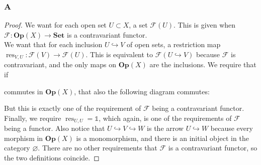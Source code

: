 \documentclass{article}
\newcommand{\fF}{\mathscr{F}}
\newcommand{\altid}{\mathds{1}}
\newcommand{\Set}{\mathbf{Set}} %
\newcommand{\Op}{\mathbf{Op}} %
\DeclareMathOperator{\res}{\mathrm{res}}
\let\emptyset\varnothing
\begin{document}
\subsubsection{A}\label{2.2.A}
\begin{proof}
    We want for each open set $U\subset X$, a set $\fF(U)$. This is given when $\fF:\Op(X)\to \Set$ is a contravariant functor.\\
    We want that for each inclusion $U\hookrightarrow V$ of open sets, a restriction map $\res_{V,U}:\fF(V)\to \fF(U)$. This is equivalent to $\fF(U\hookrightarrow V)$ because $\fF$ is contravariant, and the only maps on $\Op(X)$ are the inclusions. We require that if
    \begin{center}
    \end{center}
    commutes in $\Op(X)$, that also the following diagram commutes:
    \begin{center}
    \end{center}
    But this is exactly one of the requirement of $\fF$ being a contravariant functor.\\
    Finally, we require $\res_{U,U}=\altid$, which again, is one of the requirements of $\fF$ being a functor. Also notice that $U\hookrightarrow V\hookrightarrow W$ is the arrow $U\hookrightarrow W$ because every morphism in $\Op(X)$ is a monomorphism, and there is an initial object in the category $\emptyset$. There are no other requirements that $\fF$ is a contravariant functor, so the two definitions coincide.
\end{proof}
\end{document}
